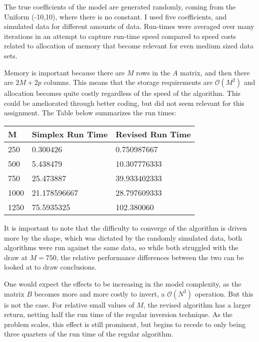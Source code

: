 \documentclass[12pt]{paper}
\newcommand{\bigO}{\mathcal{O}}
\begin{document}
The true coefficients of the model are generated randomly, coming from
the Uniform (-10,10), where there is no constant. I used five
coefficients, and simulated data for different amounts of
data. Run-times were averaged over many iterations in an attempt to
capture run-time speed compared to speed costs related to allocation
of memory that become relevant for even medium sized data sets.

Memory is important because there are $M$ rows in the $A$ matrix, and
then there are  $2M + 2p$ columns. This means that the storage
requirements are $\bigO( M^2 )$ and allocation becomes quite costly
regardless of the speed of the algorithm. This could be ameliorated
through better coding, but did not seem relevant for this
assignment. The Table below summarizes the run times:

\vspace{.1in}

\begin{centering}
\begin{tabular}{|l|l|l|}\hline
  M & Simplex Run Time & Revised Run Time\\\hline
250 &
0.300426 &
0.750987667\\
500 &
5.438479 &
10.307776333
\\
750 &
25.473887 &
39.933402333
\\
1000 &
21.178596667 &
28.797609333
\\
1250 &
75.5935325 &
102.380060\\\hline
\end{tabular}  
\end{centering}

\vspace{.1in}

It is important to note that the difficulty to converge of the
algorithm is driven more by the shape, which was dictated by the
randomly simulated data, both algorithms were run against the same
data, so while both struggled with the draw at $M = 750$, the relative
performance differences between the two can be looked at to draw
conclusions.


One would expect the effects to be increasing in the model complexity,
as the matrix $B$ becomes more and more costly to invert, a
$\bigO(N^3)$ operation. But this is not the case. For relative small
values of $M$, the revised algorithm has a larger return, netting half
the run time of the regular inversion technique. As the problem
scales, this effect is still prominent, but begins to recede to only
being three quarters of the run time of the regular algorithm.
\end{document}
